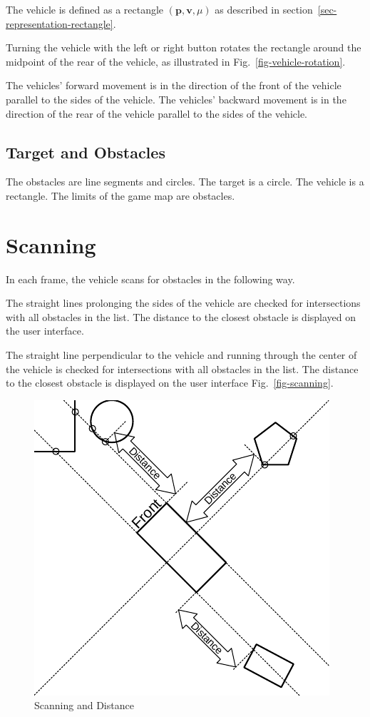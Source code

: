 \documentclass[11pt]{article}
\newcommand{\pb}{\mathbf{p}}
\newcommand{\vb}{\mathbf{v}}
\newcommand{\figref}[1]{Fig.~\eqref{#1}}
\begin{document}
The vehicle is defined as a rectangle $(\pb, \vb, \mu)$ as described in
section~\ref{sec-representation-rectangle}.

Turning the vehicle with the left or right button rotates the rectangle
around the midpoint of the rear of the vehicle, as
illustrated in \figref{fig-vehicle-rotation}.

The vehicles' forward movement is in the direction of the front of the vehicle
parallel to the sides of the vehicle.
The vehicles' backward movement is in the direction of the rear of the vehicle
parallel to the sides of the vehicle.

\subsection{Target and Obstacles}
\label{sec-obstacles}

The obstacles are line segments and circles. The target is a circle. The
vehicle is a rectangle. The limits of the game map are obstacles.

\section{Scanning}
\label{sec-scanning}
In each frame, the vehicle scans for obstacles in the following way.

The straight lines prolonging the sides of the vehicle are checked for
intersections with all obstacles in the list. The distance to the closest
obstacle is displayed on the user interface.

The straight line perpendicular to the vehicle and running through the center
of the vehicle is checked for intersections with all obstacles in the list.
The distance to the closest obstacle is displayed on the user interface
\figref{fig-scanning}.

\begin{figure}
    \centering
    \includegraphics{odg/scanning.pdf}
    \caption{Scanning and Distance}\label{fig-scanning}
\end{figure}
\end{document}
